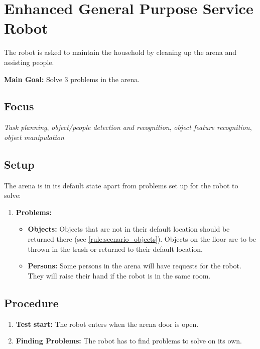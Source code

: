\section{Enhanced General Purpose Service Robot}
\label{test:egpsr}
The robot is asked to maintain the household by cleaning up the arena and assisting people.


\noindent \textbf{Main Goal:} Solve 3 problems in the arena.\\


\subsection*{Focus}
\emph{Task planning}, \emph{object/people detection and recognition}, \emph{object feature recognition}, \emph{object manipulation}


\subsection*{Setup}
The arena is in its default state apart from problems set up for the robot to solve:
\begin{enumerate}
    \item \textbf{Problems:}
		\begin{itemize}
			\item \textbf{Objects:} Objects that are not in their default location should be returned there (see \ref{rule:scenario_objects}). Objects on the floor are to be thrown in the trash or returned to their default location.
			\item \textbf{Persons:} Some persons in the arena will have requests for the robot. They will raise their hand if the robot is in the same room.
		\end{itemize}
\end{enumerate}


\subsection*{Procedure}
\begin{enumerate}[nosep]
	\item \textbf{Test start:} The robot enters when the arena door is open.
	\item \textbf{Finding Problems:} The robot has to find problems to solve on its own.
\end{enumerate}


